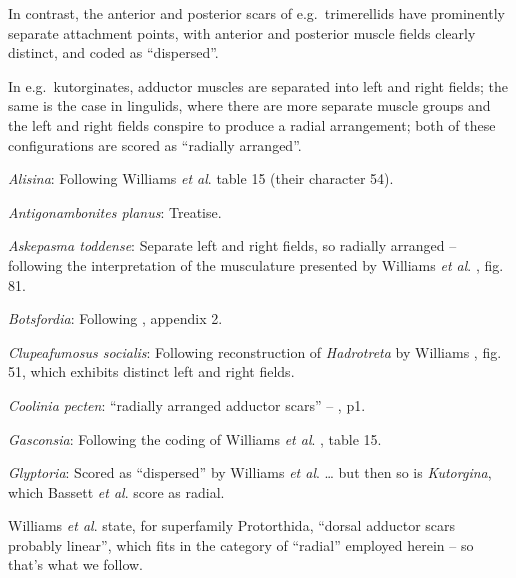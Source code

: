 \documentclass[openany]{book}
\theoremstyle{definition}
\theoremstyle{definition}
\theoremstyle{definition}
\theoremstyle{remark}
\begin{document}
In contrast, the anterior and posterior scars of e.g.~trimerellids have
prominently separate attachment points, with anterior and posterior
muscle fields clearly distinct, and coded as ``dispersed''.

In e.g.~kutorginates, adductor muscles are separated into left and right
fields; the same is the case in lingulids, where there are more separate
muscle groups and the left and right fields conspire to produce a radial
arrangement; both of these configurations are scored as ``radially
arranged''.

\hypertarget{Alisina-coding-79}{}
\emph{Alisina}: Following Williams \emph{et al}.
\citeyearpar{Williams2000LinguliformeaCraniiformea} table 15 (their
character 54).

\hypertarget{Antigonambonites_planus-coding-79}{}
\emph{Antigonambonites planus}: Treatise.

\hypertarget{Askepasma_toddense-coding-79}{}
\emph{Askepasma toddense}: Separate left and right fields, so radially
arranged -- following the interpretation of the musculature presented by
Williams \emph{et al}.
\citeyearpar{Williams2000LinguliformeaCraniiformea}, fig. 81.

\hypertarget{Botsfordia-coding-79}{}
\emph{Botsfordia}: Following \citet{Williams1998Thediversity}, appendix
2.

\hypertarget{Clupeafumosus_socialis-coding-79}{}
\emph{Clupeafumosus socialis}: Following reconstruction of
\emph{Hadrotreta} by Williams
\citeyearpar{Williams2000LinguliformeaCraniiformea}, fig. 51, which
exhibits distinct left and right fields.

\hypertarget{Coolinia_pecten-coding-79}{}
\emph{Coolinia pecten}: ``radially arranged adductor scars'' --
\citet{Bassett2017Earliestontogeny}, p1.

\hypertarget{Gasconsia-coding-79}{}
\emph{Gasconsia}: Following the coding of Williams \emph{et al}.
\citeyearpar{Williams2000LinguliformeaCraniiformea}, table 15.

\hypertarget{Glyptoria-coding-79}{}
\emph{Glyptoria}: Scored as ``dispersed'' by Williams \emph{et al}.
\citeyearpar{Williams1998Thediversity} \ldots{} but then so is
\emph{Kutorgina}, which Bassett \emph{et al}.
\citeyearpar{Bassett2001Functionalmorphology} score as radial.

Williams \emph{et al}.
\citeyearpar{Williams2000LinguliformeaCraniiformea} state, for
superfamily Protorthida, ``dorsal adductor scars probably linear'',
which fits in the category of ``radial'' employed herein -- so that's
what we follow.
\end{document}
